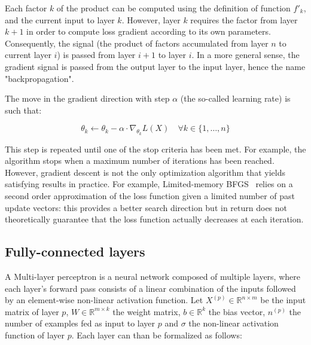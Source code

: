         Each factor $k$ of the product can be computed using the definition of function $f'_k$, and the current input to layer $k$.
        However, layer $k$ requires the factor from layer $k+1$ in order to compute loss gradient according to its own parameters.
        Consequently, the signal (the product of factors accumulated from layer $n$ to current layer $i$) is passed from layer $i+1$ to layer $i$.
        In a more general sense, the gradient signal is passed from the output layer to the input layer, hence the name "backpropagation".

        The move in the gradient direction with step $\alpha$ (the so-called learning rate) is such that:

        \begin{equation}
            \theta_k \leftarrow \theta_k - \alpha \cdot \nabla_{\theta_k}L(X) \quad \forall k \in \{1, \ldots, n\}
        \end{equation}

        This step is repeated until one of the stop criteria has been met. For example, the algorithm stops when a maximum number of iterations has been
        reached. However, gradient descent is not the only optimization algorithm that yields satisfying results in practice.
        For example, Limited-memory BFGS~\cite{LBFGS} relies on a second order approximation of the loss function given a limited number of past
        update vectors: this provides a better search direction but in return does not theoretically guarantee that the loss function actually decreases at each
        iteration.

    \subsection{Fully-connected layers}

        A Multi-layer perceptron is a neural network composed of multiple layers,
        where each layer's forward pass consists of a linear combination of the inputs
        followed by an element-wise non-linear activation function.
        Let $X^{(p)} \in \mathbb{R}^{n \times m}$ be the input matrix of layer $p$,  %
        $W \in \mathbb{R}^{m \times k}$ the weight matrix,  %
        $b \in \mathbb{R}^{k}$ the bias vector, $n^{(p)}$ the number of examples fed as input to layer $p$  %
        and $\sigma$ the non-linear activation function of layer $p$.
        Each layer can than be formalized as follows:

